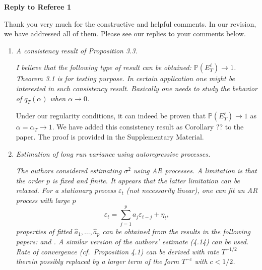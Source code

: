 \documentclass[a4paper,12pt]{article}
\begin{document}
 
\newpage
\begin{center}
{\large \bf Reply to Referee 1} 
\end{center}


Thank you very much for the constructive and helpful comments. In our revision, we have addressed all of them. Please see our replies to your comments below.


\begin{enumerate}[label=(\arabic*),leftmargin=0.8cm]

\item \textit{A consistency result of Proposition 3.3.}

\textit{I believe that the following type of result can be obtained: $\mathbb{P} (E^{\ell}_T) \to 1$. Theorem 3.1 is for testing purpose. In certain application one might be interested in such consistency result. Basically one needs to study the behavior of $q_T(\alpha)$ when $\alpha \to 0$.}

Under our regularity conditions, it can indeed be proven that $\mathbb{P} (E^{\ell}_T) \to 1$ as $\alpha=\alpha_T \rightarrow 1$. We have added this consistency result as Corollary ?? to the paper. The proof is provided in the Supplementary Material.


\item \textit{Estimation of long run variance using autoregressive processes.}

\textit{The authors considered estimating $\sigma^2$ using AR processes. A limitation is that the order $p$ is fixed and finite. It appears that the latter limitation can be relaxed. For a stationary process $\varepsilon_t$ (not necessarily linear), one can fit an AR process with large $p$}
\[ \varepsilon_t = \sum_{j=1}^p a_j \varepsilon_{t-j} + \eta_t, \]
\textit{properties of fitted $\widehat{a}_1, \ldots, \widehat{a}_p$ can be obtained from the results in the following papers: \cite{WuPourahmadi2009} and \cite{XiaoWu2012}.
A similar version of the authors' estimate (4.14) can be used. Rate of convergence (cf.\ Proposition 4.1) can be derived with rate $T^{-1/2}$ therein possibly replaced by a larger term of the form $T^{-c}$ with $c < 1/2$.}


\end{enumerate}
\end{document}
